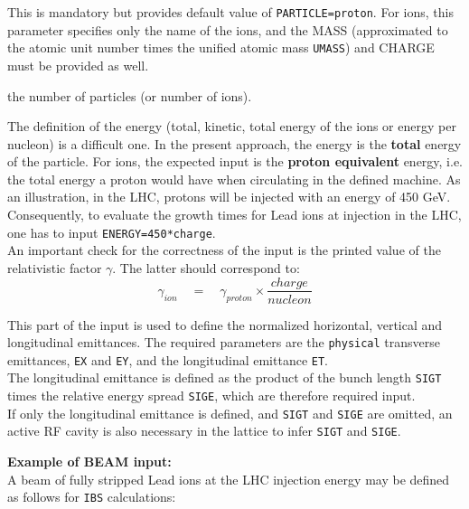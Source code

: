 \begin{madlist}
   This is mandatory but \madx provides default
  value of \texttt{PARTICLE=proton}. For ions, this parameter specifies
  only the name of the ions, and the MASS (approximated to the atomic
  unit number times the unified atomic mass \texttt{UMASS}) and CHARGE must be
  provided as well.

   the number of particles (or number of ions).

   The definition of the energy (total, kinetic, total
  energy of the ions or energy per nucleon) is a difficult one. In the
  present approach, the energy is the \textbf{total} energy of the
  particle. For ions, the expected input is the \textbf{proton
    equivalent} energy, i.e. the total energy a proton would have when
  circulating in the defined machine. As an illustration, in the LHC,
  protons will be injected with an energy of 450 GeV. Consequently, to
  evaluate the growth times for Lead ions at injection in the LHC, one
  has to input \texttt{ENERGY=450*charge}. \\
  An important check for the correctness of the input is the printed value
  of the relativistic factor  $\gamma$. The latter should correspond to:   
  \[
  \gamma_{ion} \quad = \quad \gamma_{proton} \times \frac{charge}{nucleon}
  \]

   This part of the input is used to define the
  normalized horizontal, vertical and longitudinal emittances. 
  The required parameters are the \texttt{physical} transverse
  emittances, \texttt{EX} and \texttt{EY}, and the longitudinal
  emittance \texttt{ET}.\\  
  The longitudinal emittance is defined  as the product of the bunch
  length \texttt{SIGT} times the relative energy spread \texttt{SIGE},
  which are therefore required input. \\  
  If only the longitudinal emittance is defined, and \texttt{SIGT}
  and \texttt{SIGE} are omitted, an active RF cavity is also
  necessary in the lattice to infer \texttt{SIGT} and \texttt{SIGE}.

\end{madlist}


\textbf{Example of BEAM input:}\\
A beam of fully stripped Lead ions at the LHC injection energy may be
defined as follows for \texttt{IBS} calculations: 


